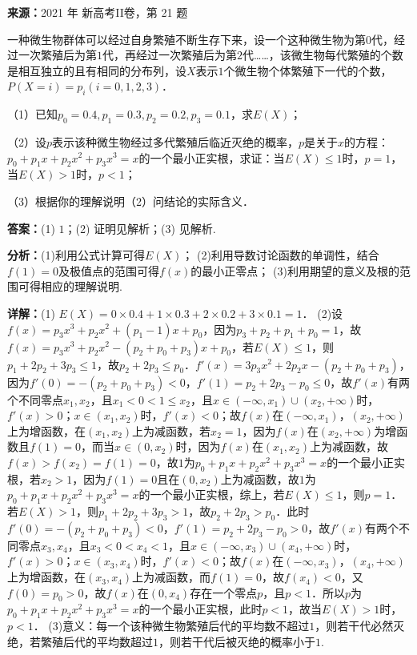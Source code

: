 \begin{question}[points=12]
\textbf{来源：}2021 年 新高考II卷，第 21 题\par
一种微生物群体可以经过自身繁殖不断生存下来，设一个这种微生物为第$0$代，经过一次繁殖后为第$1$代，再经过一次繁殖后为第$2$代……，该微生物每代繁殖的个数是相互独立的且有相同的分布列，设$X$表示$1$个微生物个体繁殖下一代的个数，$P(X=i)=p_i(i=0,1,2,3)$．

（1）已知$p_0=0.4,p_1=0.3,p_2=0.2,p_3=0.1$，求$E(X)$；

（2）设$p$表示该种微生物经过多代繁殖后临近灭绝的概率，$p$是关于$x$的方程：$p_0+p_1x+p_2x^2+p_3x^3=x$的一个最小正实根，求证：当$E(X)\leq1$时，$p=1$，当$E(X)>1$时，$p<1$；

（3）根据你的理解说明（2）问结论的实际含义．
\begin{solution}
\textbf{答案：}(1) $1$；(2) 证明见解析；(3) 见解析.

\textbf{分析：}(1)利用公式计算可得$E(X)$； (2)利用导数讨论函数的单调性，结合$f(1)=0$及极值点的范围可得$f(x)$的最小正零点； (3)利用期望的意义及根的范围可得相应的理解说明.

\textbf{详解：}(1) $E(X)=0\times0.4+1\times0.3+2\times0.2+3\times0.1=1$． (2)设$f(x)=p_3x^3+p_2x^2+(p_1-1)x+p_0$，因为$p_3+p_2+p_1+p_0=1$，故$f(x)=p_3x^3+p_2x^2-(p_2+p_0+p_3)x+p_0$，若$E(X)\leq1$，则$p_1+2p_2+3p_3\leq1$，故$p_2+2p_3\leq p_0$．$f'(x)=3p_3x^2+2p_2x-(p_2+p_0+p_3)$，因为$f'(0)=-(p_2+p_0+p_3)<0$，$f'(1)=p_2+2p_3-p_0\leq0$，故$f'(x)$有两个不同零点$x_1,x_2$，且$x_1<0<1\leq x_2$，且$x\in(-\infty,x_1)\cup(x_2,+\infty)$时，$f'(x)>0$；$x\in(x_1,x_2)$时，$f'(x)<0$；故$f(x)$在$(-\infty,x_1)$，$(x_2,+\infty)$上为增函数，在$(x_1,x_2)$上为减函数，若$x_2=1$，因为$f(x)$在$(x_2,+\infty)$为增函数且$f(1)=0$，而当$x\in(0,x_2)$时，因为$f(x)$在$(x_1,x_2)$上为减函数，故$f(x)>f(x_2)=f(1)=0$，故$1$为$p_0+p_1x+p_2x^2+p_3x^3=x$的一个最小正实根，若$x_2>1$，因为$f(1)=0$且在$(0,x_2)$上为减函数，故$1$为$p_0+p_1x+p_2x^2+p_3x^3=x$的一个最小正实根，综上，若$E(X)\leq1$，则$p=1$．若$E(X)>1$，则$p_1+2p_2+3p_3>1$，故$p_2+2p_3>p_0$．此时$f'(0)=-(p_2+p_0+p_3)<0$，$f'(1)=p_2+2p_3-p_0>0$，故$f'(x)$有两个不同零点$x_3,x_4$，且$x_3<0<x_4<1$，且$x\in(-\infty,x_3)\cup(x_4,+\infty)$时，$f'(x)>0$；$x\in(x_3,x_4)$时，$f'(x)<0$；故$f(x)$在$(-\infty,x_3)$，$(x_4,+\infty)$上为增函数，在$(x_3,x_4)$上为减函数，而$f(1)=0$，故$f(x_4)<0$，又$f(0)=p_0>0$，故$f(x)$在$(0,x_4)$存在一个零点$p$，且$p<1$．所以$p$为$p_0+p_1x+p_2x^2+p_3x^3=x$的一个最小正实根，此时$p<1$，故当$E(X)>1$时，$p<1$． (3)意义：每一个该种微生物繁殖后代的平均数不超过$1$，则若干代必然灭绝，若繁殖后代的平均数超过$1$，则若干代后被灭绝的概率小于$1$.
\end{solution}
\end{question}

